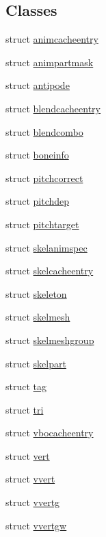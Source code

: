 \subsection*{Classes}
\begin{DoxyCompactItemize}
\item 
struct \hyperlink{structskelmodel_1_1animcacheentry}{animcacheentry}
\item 
struct \hyperlink{structskelmodel_1_1animpartmask}{animpartmask}
\item 
struct \hyperlink{structskelmodel_1_1antipode}{antipode}
\item 
struct \hyperlink{structskelmodel_1_1blendcacheentry}{blendcacheentry}
\item 
struct \hyperlink{structskelmodel_1_1blendcombo}{blendcombo}
\item 
struct \hyperlink{structskelmodel_1_1boneinfo}{boneinfo}
\item 
struct \hyperlink{structskelmodel_1_1pitchcorrect}{pitchcorrect}
\item 
struct \hyperlink{structskelmodel_1_1pitchdep}{pitchdep}
\item 
struct \hyperlink{structskelmodel_1_1pitchtarget}{pitchtarget}
\item 
struct \hyperlink{structskelmodel_1_1skelanimspec}{skelanimspec}
\item 
struct \hyperlink{structskelmodel_1_1skelcacheentry}{skelcacheentry}
\item 
struct \hyperlink{structskelmodel_1_1skeleton}{skeleton}
\item 
struct \hyperlink{structskelmodel_1_1skelmesh}{skelmesh}
\item 
struct \hyperlink{structskelmodel_1_1skelmeshgroup}{skelmeshgroup}
\item 
struct \hyperlink{structskelmodel_1_1skelpart}{skelpart}
\item 
struct \hyperlink{structskelmodel_1_1tag}{tag}
\item 
struct \hyperlink{structskelmodel_1_1tri}{tri}
\item 
struct \hyperlink{structskelmodel_1_1vbocacheentry}{vbocacheentry}
\item 
struct \hyperlink{structskelmodel_1_1vert}{vert}
\item 
struct \hyperlink{structskelmodel_1_1vvert}{vvert}
\item 
struct \hyperlink{structskelmodel_1_1vvertg}{vvertg}
\item 
struct \hyperlink{structskelmodel_1_1vvertgw}{vvertgw}
\end{DoxyCompactItemize}
